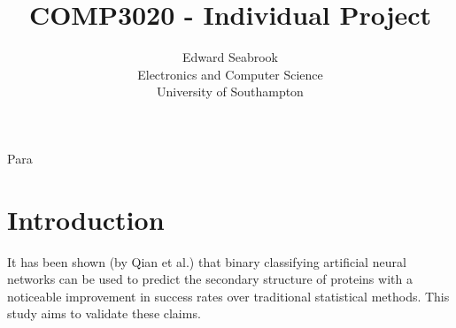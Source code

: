 \title{COMP3020 - Individual Project}
\author{Edward Seabrook \\ Electronics and Computer Science \\ University of Southampton }



Para

\section{Introduction}

It has been shown (by Qian et al.) that binary classifying artificial neural networks can be used to predict the secondary structure of proteins with a noticeable improvement in success rates over traditional statistical methods. This study aims to validate these claims.


